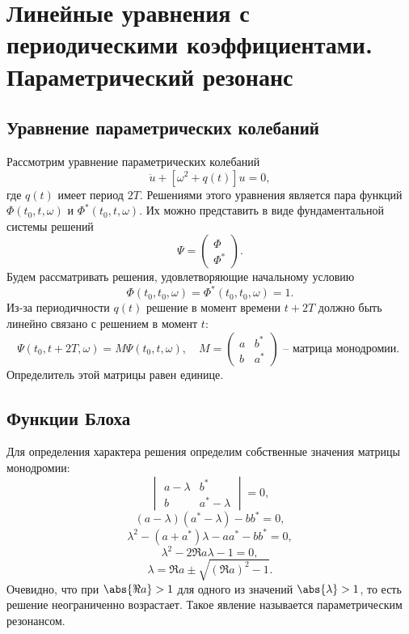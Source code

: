 \section{Линейные уравнения с периодическими коэффициентами. Параметрический
    резонанс}
\subsection{Уравнение параметрических колебаний}
Рассмотрим уравнение параметрических колебаний
\[
    \ddot{u} + [\omega^2 + q(t)]u = 0,
\]
где \( q(t) \) имеет период \( 2T \). Решениями этого уравнения является пара
функций \( \Phi(t_0, t, \omega) \) и \( \Phi^*(t_0, t, \omega) \). Их можно
представить в виде фундаментальной системы решений
\[
    \Psi =
        \begin{pmatrix}
            \Phi \\
            \Phi^*
        \end{pmatrix}
    .
\]
Будем рассматривать решения, удовлетворяющие начальному условию
\[
    \Phi(t_0, t_0, \omega) = \Phi^*(t_0, t_0, \omega) = 1.
\]
Из-за периодичности \( q(t) \) решение в момент времени \( t+2T \) должно быть
линейно связано с решением в момент \( t \):
\[
    \Psi(t_0, t+2T, \omega) = M \Psi(t_0, t, \omega), \quad M =
        \begin{pmatrix}
            a & b^* \\
            b & a^*
        \end{pmatrix}
    \text{ -- матрица монодромии. }
\]
Определитель этой матрицы равен единице.

\subsection{Функции Блоха}
Для определения характера решения определим собственные значения матрицы
монодромии:
\[
    \begin{vmatrix}
        a - \lambda & b^*          \\
        b           & a^* - \lambda
    \end{vmatrix}
    = 0,
\]
\[
    (a - \lambda)(a^* - \lambda) - bb^* = 0,
\]
\[
    \lambda^2 - (a + a^*)\lambda - aa^* - bb^* = 0,
\]
\[
    \lambda^2 - 2\Re{a} \lambda - 1 = 0,
\]
\[
    \lambda = \Re{a} \pm \sqrt{(\Re{a})^2 - 1}.
\]
Очевидно, что при \( \abs{\Re{a}} > 1 \) для одного из значений
\( \abs{\lambda} > 1 \), то есть решение неограниченно возрастает. Такое явление
называется параметрическим резонансом.
